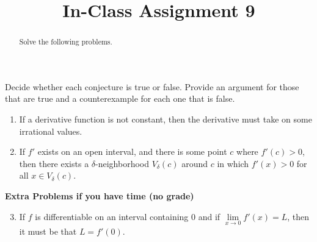 \documentclass{ximera}
\begin{document}
    \title{In-Class Assignment 9}
    \begin{abstract} Solve the following problems. \end{abstract}
    \maketitle

\begin{exercise}
    Decide whether each conjecture is true or false.  Provide an argument for those that are true and a counterexample for each one that is false.  
    \begin{enumerate}
        \item If a derivative function is not constant, then the derivative must take on some irrational values.
        \vfill
        \item If $f'$ exists on an open interval, and there is some point $c$ where $f'(c) >0$, then there exists a $\delta$-neighborhood $V_\delta(c)$ around $c$ in which $f'(x) > 0$ for all $x \in V_{\delta}(c)$.
        \vfill
    \end{enumerate} 

    \newpage

    \textbf{Extra Problems if you have time (no grade)}

    \begin{enumerate}\setcounter{enumi}{2}
        \item  If $f$ is differentiable on an interval containing $0$ and if $\lim\limits_{x\to 0} f'(x) = L$, then it must be that $L = f'(0)$.
    \end{enumerate}
\end{exercise}
\end{document}
